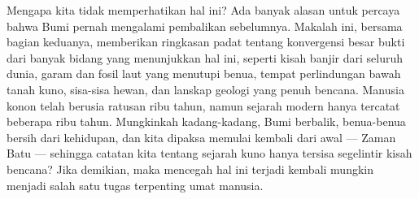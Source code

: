 \documentclass[10pt,twocolumn,letterpaper]{article}
\begin{document}
Mengapa kita tidak memperhatikan hal ini? Ada banyak alasan untuk percaya bahwa Bumi pernah mengalami pembalikan sebelumnya. Makalah ini, bersama bagian keduanya, memberikan ringkasan padat tentang konvergensi besar bukti dari banyak bidang yang menunjukkan hal ini, seperti kisah banjir dari seluruh dunia, garam dan fosil laut yang menutupi benua, tempat perlindungan bawah tanah kuno, sisa-sisa hewan, dan lanskap geologi yang penuh bencana. Manusia konon telah berusia ratusan ribu tahun, namun sejarah modern hanya tercatat beberapa ribu tahun. Mungkinkah kadang-kadang, Bumi berbalik, benua-benua bersih dari kehidupan, dan kita dipaksa memulai kembali dari awal — Zaman Batu — sehingga catatan kita tentang sejarah kuno hanya tersisa segelintir kisah bencana? Jika demikian, maka mencegah hal ini terjadi kembali mungkin menjadi salah satu tugas terpenting umat manusia.
\end{document}
